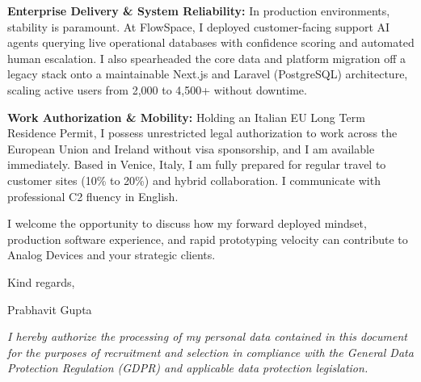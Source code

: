 \documentclass[10.5pt,a4paper]{article}
\begin{document}
\textbf{Enterprise Delivery \& System Reliability:} In production environments, stability is paramount. At FlowSpace, I deployed customer-facing support AI agents querying live operational databases with confidence scoring and automated human escalation. I also spearheaded the core data and platform migration off a legacy stack onto a maintainable Next.js and Laravel (PostgreSQL) architecture, scaling active users from 2,000 to 4,500+ without downtime.

\textbf{Work Authorization \& Mobility:} Holding an Italian EU Long Term Residence Permit, I possess unrestricted legal authorization to work across the European Union and Ireland without visa sponsorship, and I am available immediately. Based in Venice, Italy, I am fully prepared for regular travel to customer sites (10\% to 20\%) and hybrid collaboration. I communicate with professional C2 fluency in English.

I welcome the opportunity to discuss how my forward deployed mindset, production software experience, and rapid prototyping velocity can contribute to Analog Devices and your strategic clients.

Kind regards,

Prabhavit Gupta

\vspace{0.4em}
{\footnotesize \textit{I hereby authorize the processing of my personal data contained in this document for the purposes of recruitment and selection in compliance with the General Data Protection Regulation (GDPR) and applicable data protection legislation.}\par}
\end{document}
